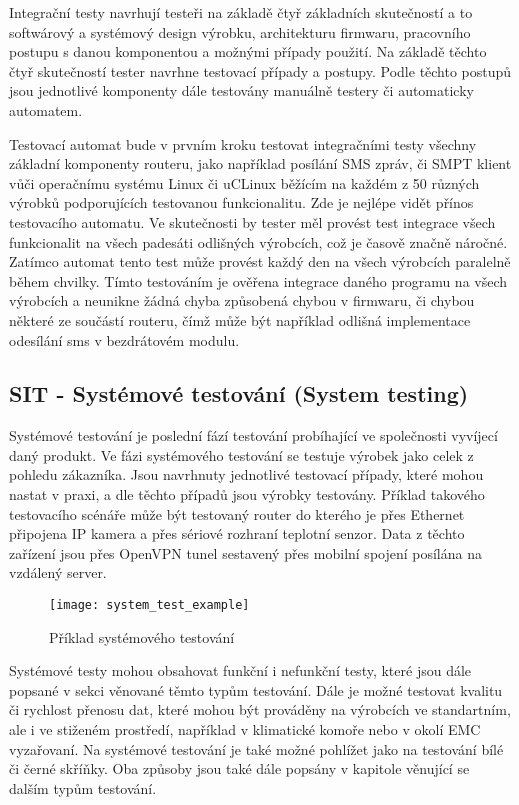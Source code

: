 Integrační testy navrhují testeři na základě čtyř základních skutečností a to softwárový a systémový design výrobku, architekturu firmwaru, pracovního postupu s danou komponentou a možnými případy použití. Na základě těchto čtyř skutečností tester navrhne testovací případy a postupy. Podle těchto postupů jsou jednotlivé komponenty dále testovány manuálně testery či automaticky automatem.

Testovací automat bude v prvním kroku testovat integračními testy všechny základní komponenty routeru, jako například posílání SMS zpráv, či SMPT klient vůči operačnímu systému Linux či uCLinux běžícím na každém z 50 různých výrobků podporujících testovanou funkcionalitu. Zde je nejlépe vidět přínos testovacího automatu. Ve skutečnosti by tester měl provést test integrace všech funkcionalit na všech padesáti odlišných výrobcích, což je časově značně náročné. Zatímco automat tento test může provést každý den na všech výrobcích paralelně během chvilky. Tímto testováním je ověřena integrace daného programu na všech výrobcích a neunikne žádná chyba způsobená chybou v firmwaru, či chybou některé ze součástí routeru, čímž může být například odlišná implementace odesílání sms v bezdrátovém modulu.

\subsection{SIT - Systémové testování (System testing)}
Systémové testování je poslední fází testování probíhající ve společnosti vyvíjecí daný produkt. Ve fázi systémového testování se testuje výrobek jako celek z pohledu zákazníka. Jsou navrhnuty jednotlivé testovací případy, které mohou nastat v praxi, a dle těchto případů jsou výrobky testovány. Příklad takového testovacího scénáře může být testovaný router do kterého je přes Ethernet připojena IP kamera a přes sériové rozhraní teplotní senzor. Data z těchto zařízení jsou přes OpenVPN tunel sestavený přes mobilní spojení posílána na vzdálený server.

\begin{figure}[h]
  \centering
  \texttt{[image: system\_test\_example]}
  \caption{Příklad systémového testování}
  \label{fig:system_test_example}
\end{figure}

Systémové testy mohou obsahovat funkční i nefunkční testy, které jsou dále popsané v sekci věnované těmto typům testování. Dále je možné testovat kvalitu či rychlost přenosu dat, které mohou být prováděny na výrobcích ve standartním, ale i ve stiženém prostředí, například v klimatické komoře nebo v okolí EMC vyzařovaní. Na systémové testování je také možné pohlížet jako na testování bílé či černé skříňky. Oba způsoby jsou také dále popsány v kapitole věnující se dalším typům testování.


